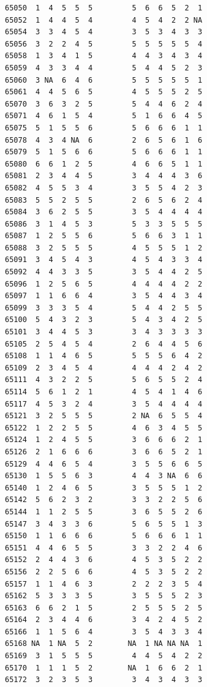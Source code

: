 \documentclass[
  letterpaper,
  DIV=11,
  numbers=noendperiod]{scrreprt}
\begin{document}
\begin{verbatim}
65050  1  4  5  5  5         5  6  6  5  2  1
65052  1  4  4  5  4         4  5  4  2  2 NA
65054  3  3  4  5  4         3  5  3  4  3  3
65056  3  2  2  4  5         5  5  5  5  5  4
65058  1  3  4  1  5         4  4  3  4  3  4
65059  4  3  3  4  4         5  4  4  5  2  3
65060  3 NA  6  4  6         5  5  5  5  5  1
65061  4  4  5  6  5         4  5  5  5  2  5
65070  3  6  3  2  5         5  4  4  6  2  4
65071  4  6  1  5  4         5  1  6  6  4  5
65075  5  1  5  5  6         5  6  6  6  1  1
65078  4  3  4 NA  6         2  6  5  6  1  6
65079  5  1  5  6  6         5  6  6  6  1  1
65080  6  6  1  2  5         4  6  6  5  1  1
65081  2  3  4  4  5         3  4  4  4  3  6
65082  4  5  5  3  4         3  5  5  4  2  3
65083  5  5  2  5  5         2  6  5  6  2  4
65084  3  6  2  5  5         3  5  4  4  4  4
65086  3  1  4  5  3         5  3  3  5  5  5
65087  1  2  5  5  6         5  6  6  3  1  1
65088  3  2  5  5  5         4  5  5  5  1  2
65091  3  4  5  4  3         4  5  4  3  3  4
65092  4  4  3  3  5         3  5  4  4  2  5
65096  1  2  5  6  5         4  4  4  4  2  2
65097  1  1  6  6  4         3  5  4  4  3  4
65099  3  3  3  5  4         5  4  4  2  5  5
65100  5  4  3  2  3         5  4  3  4  2  5
65101  3  4  4  5  3         3  4  3  3  3  3
65105  2  5  4  5  4         2  6  4  4  5  6
65108  1  1  4  6  5         5  5  5  6  4  2
65109  2  3  4  5  4         4  4  4  2  4  2
65111  4  3  2  2  5         5  6  5  5  2  4
65114  5  6  1  2  1         4  5  4  1  4  6
65117  4  5  3  2  4         3  5  4  4  4  4
65121  3  2  5  5  5         2 NA  6  5  5  4
65122  1  2  2  5  5         4  6  3  4  5  5
65124  1  2  4  5  5         3  6  6  6  2  1
65126  2  1  6  6  6         3  6  6  5  2  1
65129  4  4  6  5  4         3  5  5  6  6  5
65130  1  5  5  6  3         4  4  3 NA  6  6
65140  1  2  4  6  5         3  5  5  5  1  2
65142  5  6  2  3  2         3  3  2  2  5  6
65144  1  1  2  5  5         3  6  5  5  2  6
65147  3  4  3  3  6         5  6  5  5  1  3
65150  1  1  6  6  6         5  6  6  6  1  1
65151  4  4  6  5  5         3  3  2  2  4  6
65152  2  4  4  3  6         4  5  3  5  2  2
65156  2  2  5  6  6         4  5  3  5  2  2
65157  1  1  4  6  3         2  2  2  3  5  4
65162  5  3  3  3  5         3  5  5  5  2  3
65163  6  6  2  1  5         2  5  5  5  2  5
65164  2  3  4  4  6         3  4  2  4  5  2
65166  1  1  5  6  4         3  5  4  3  3  4
65168 NA  1 NA  5  2        NA  1 NA NA NA  1
65169  3  1  5  5  5         4  4  5  4  2  2
65170  1  1  1  5  2        NA  1  6  6  2  1
65172  3  2  3  5  3         3  4  3  4  3  3

\end{verbatim}
\end{document}
